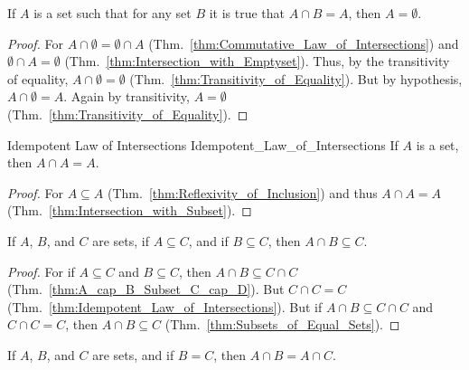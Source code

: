         \begin{theorem}
            \label{thm:Empty_Set_Is_Zero_for_Intersections}%
            If $A$ is a set such that for any set $B$ it is true that
            $A\cap{B}=A$, then $A=\emptyset$.
        \end{theorem}
        \begin{proof}
            For $A\cap\emptyset=\emptyset\cap{A}$
            (Thm.~\ref{thm:Commutative_Law_of_Intersections}) and
            $\emptyset\cap{A}=\emptyset$
            (Thm.~\ref{thm:Intersection_with_Emptyset}). Thus, by the
            transitivity of equality, $A\cap\emptyset=\emptyset$
            (Thm.~\ref{thm:Transitivity_of_Equality}). But by hypothesis,
            $A\cap\emptyset=A$. Again by transitivity, $A=\emptyset$
            (Thm.~\ref{thm:Transitivity_of_Equality}).
        \end{proof}
        \begin{ltheorem}{Idempotent Law of Intersections}
                        {Idempotent_Law_of_Intersections}
            If $A$ is a set, then $A\cap{A}=A$.
        \end{ltheorem}
        \begin{proof}
            For $A\subseteq{A}$ (Thm.~\ref{thm:Reflexivity_of_Inclusion}) and
            thus $A\cap{A}=A$ (Thm.~\ref{thm:Intersection_with_Subset}).
        \end{proof}
        \begin{theorem}
            \label{thm:Intersection_of_Subsets_is_Still_Subset}%
            If $A$, $B$, and $C$ are sets, if $A\subseteq{C}$, and if
            $B\subseteq{C}$, then $A\cap{B}\subseteq{C}$.
        \end{theorem}
        \begin{proof}
            For if $A\subseteq{C}$ and $B\subseteq{C}$, then
            $A\cap{B}\subseteq{C}\cap{C}$
            (Thm.~\ref{thm:A_cap_B_Subset_C_cap_D}). But $C\cap{C}=C$
            (Thm.~\ref{thm:Idempotent_Law_of_Intersections}). But if
            $A\cap{B}\subseteq{C}\cap{C}$ and $C\cap{C}=C$, then
            $A\cap{B}\subseteq{C}$ (Thm.~\ref{thm:Subsets_of_Equal_Sets}).
        \end{proof}
        \begin{theorem}
            \label{thm:Intersection_with_Equal_Sets}%
            If $A$, $B$, and $C$ are sets, and if $B=C$, then
            $A\cap{B}=A\cap{C}$.
        \end{theorem}
